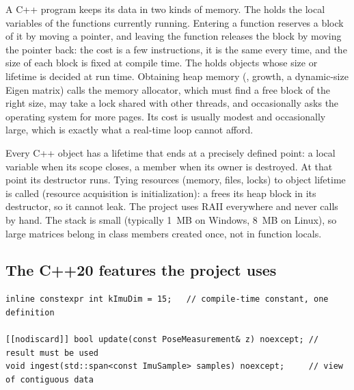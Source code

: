 A C++ program keeps its data in two kinds of memory. The  holds the local variables of the functions currently running. Entering a
function reserves a block of it by moving a pointer, and leaving the function releases the block by moving the pointer back: the cost is a
few instructions, it is the same every time, and the size of each block is fixed at compile time. The  holds objects whose size or
lifetime is decided at run time. Obtaining heap memory (,  growth, a dynamic-size Eigen matrix) calls the memory
allocator, which must find a free block of the right size, may take a lock shared with other threads, and occasionally asks the operating
system for more pages. Its cost is usually modest and occasionally large, which is exactly what a real-time loop cannot afford.

Every C++ object has a lifetime that ends at a precisely defined point: a local variable when its scope closes, a member when its owner is
destroyed. At that point its destructor runs. Tying resources (memory, files, locks) to object lifetime is called  (resource
acquisition is initialization): a  frees its heap block in its destructor, so it cannot leak. The project uses RAII
everywhere and never calls  by hand. The stack is small (typically \SI{1}{MB} on Windows, \SI{8}{MB} on Linux), so large
matrices belong in class members created once, not in function locals.

\subsection{The C++20 features the project uses}

\begin{lstlisting}
inline constexpr int kImuDim = 15;   // compile-time constant, one definition

[[nodiscard]] bool update(const PoseMeasurement& z) noexcept; // result must be used
void ingest(std::span<const ImuSample> samples) noexcept;     // view of contiguous data
\end{lstlisting}

